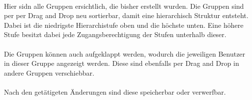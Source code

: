 \paragraph{}Hier sidn alle Gruppen ersichtlich, die bisher erstellt wurden.
Die Gruppen sind per per Drag and Drop neu sortierbar, damit eine hierarchisch Struktur entsteht.
Dabei ist die niedrigste Hierarchistufe oben und die höchste unten. 
Eine höhere Stufe besitzt dabei jede Zugangsberechtigung der Stufen unterhalb dieser. 
\\
\paragraph{}Die Gruppen können auch aufgeklappt werden, wodurch die jeweiligen Benutzer in dieser Gruppe angezeigt werden.
Diese sind ebenfalls per Drag and Drop in andere Gruppen verschiebbar.
\\
\paragraph{}Nach den getätigeten Änderungen sind diese speicherbar oder verwerfbar. 